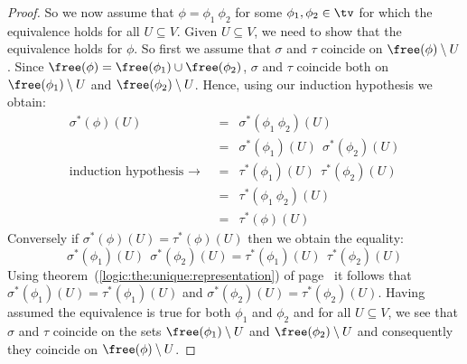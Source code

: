 \begin{proof}
    So we now assume that $\phi=\phi_{1}\ \phi_{2}$ for some 
    $\phi_{1},\phi_{2}\in\tv$ for which the equivalence holds for all
    $U\subseteq V$. Given $U\subseteq V$, we need to show that the 
    equivalence holds for $\phi$. So first we assume that $\sigma$ and
    $\tau$ coincide on $\free(\phi)\setminus U$. Since $\free(\phi)=
    \free(\phi_{1})\cup\free(\phi_{2})$, $\sigma$ and $\tau$ coincide
    both on $\free(\phi_{1})\setminus U$ and $\free(\phi_{2})\setminus U$.
    Hence, using our induction hypothesis we obtain:
        \begin{eqnarray*}\sigma^{*}(\phi)(U)
            &=&\sigma^{*}(\phi_{1}\ \phi_{2})(U)\\
            &=&\sigma^{*}(\phi_{1})(U)\ \ \sigma^{*}(\phi_{2})(U)\\
            \mbox{induction hypothesis\ $\rightarrow$\ }
            &=&\tau^{*}(\phi_{1})(U)\ \ \tau^{*}(\phi_{2})(U)\\
            &=&\tau^{*}(\phi_{1}\ \phi_{2})(U)\\
            &=&\tau^{*}(\phi)(U)
        \end{eqnarray*}
    Conversely if $\sigma^{*}(\phi)(U)=\tau^{*}(\phi)(U)$ then we obtain
    the equality: 
        \[
            \sigma^{*}(\phi_{1})(U)\ \ \sigma^{*}(\phi_{2})(U)
            =
            \tau^{*}(\phi_{1})(U)\ \ \tau^{*}(\phi_{2})(U)
        \]
    Using theorem~(\ref{logic:the:unique:representation}) of
    page~\pageref{logic:the:unique:representation} it follows that
    $\sigma^{*}(\phi_{1})(U)=\tau^{*}(\phi_{1})(U)$ and
    $\sigma^{*}(\phi_{2})(U)=\tau^{*}(\phi_{2})(U)$. Having assumed 
    the equivalence is true for both $\phi_{1}$ and $\phi_{2}$ and
    for all $U\subseteq V$, we see that $\sigma$ and $\tau$ coincide 
    on the sets $\free(\phi_{1})\setminus U$ and $\free(\phi_{2})\setminus U$
    and consequently they coincide on $\free(\phi)\setminus U$.


\end{proof}
